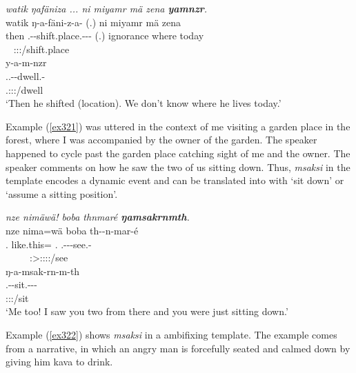 \begin{exe}
	\ex \emph{watik ŋafäniza ... ni miyamr mä zena \textbf{yamnzr}.}\\
	\glll watik ŋ-a-fäni-z-a-\Zero{} (.) ni miyamr mä zena\\
	then \M.\Alph{}-\Vc-shift.place.\Ext-\Ndu-\Pst-\Stsg{} (.) {\Fnsg} ignorance where today\\
	~ {\footnotesize \Stsg:\Sbj:\Pst:\Ipfv/shift.place} ~ ~ ~ ~ ~\\
	\sn
	\glll y-a-m-nzr\\
	\Tsg.\Masc.\Alph-\Vc-dwell.\Ext-\Ndu\\
	{\footnotesize \Tsg.\Masc:\Sbj:\Nonpast:\Ipfv/dwell}\\
	\trans `Then he shifted (location). We don't know where he lives today.'\\ 
	\label{ex320}
\end{exe}

Example (\ref{ex321}) was uttered in the context of me visiting a garden place in the forest, where I was accompanied by the owner of the garden. The speaker happened to cycle past the garden place catching sight of me and the owner. The speaker comments on how he saw the two of us sitting down. Thus, \emph{msaksi} in the  template encodes a dynamic event and can be translated into  with `sit down' or `assume a sitting position'.

\begin{exe}
	\ex \emph{nze nimäwä! boba thnmaré \textbf{ŋamsakrnmth}.}\\
	\glll nze nima=wä boba th-\Zero{}-n-mar-é\\
	\Fsg.{\Erg} like.this={\Emph} \Med.{\Abl} \Stnsg.\Gam-\Du-\Venit-see.\Rs-\Fsg{}\\
	~ ~ ~ {\footnotesize \Fsg:\Sbj>\Stdu:\Obj:\Rpst:\Pfv:\Venit/see}\\
	\sn
	\glll ŋ-a-msak-rn-m-th\\
	\M.\Alph-\Vc-sit.\Ext-\Du-\Dur-\Stnsg{}\\
	{\footnotesize \Stdu:\Sbj:\Rpst:\Dur/sit}\\
	\trans `Me too! I saw you two from there and you were just sitting down.'\\ 
	\label{ex321}
\end{exe}

Example (\ref{ex322}) shows \emph{msaksi} in a  ambifixing template. The example comes from a narrative, in which an angry man is forcefully seated and calmed down by giving him kava to drink.

